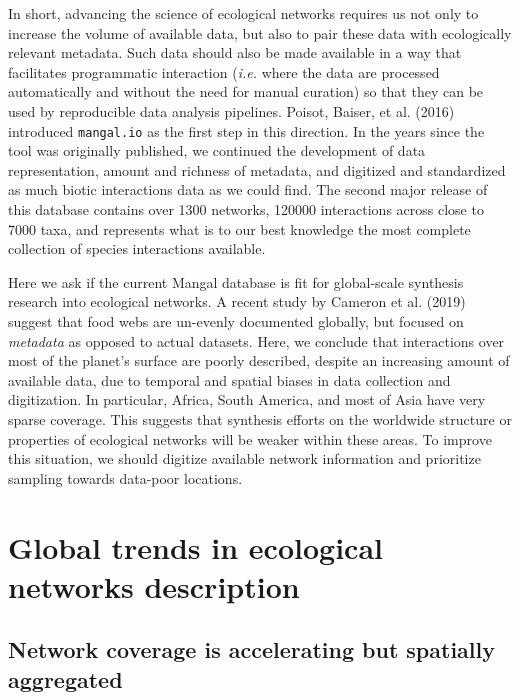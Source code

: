 \documentclass[11pt]{article}
\begin{document}
In short, advancing the science of ecological networks requires us not
only to increase the volume of available data, but also to pair these
data with ecologically relevant metadata. Such data should also be made
available in a way that facilitates programmatic interaction
(\emph{i.e.} where the data are processed automatically and without the
need for manual curation) so that they can be used by reproducible data
analysis pipelines. Poisot, Baiser, et al. (2016) introduced
\texttt{mangal.io} as the first step in this direction. In the years
since the tool was originally published, we continued the development of
data representation, amount and richness of metadata, and digitized and
standardized as much biotic interactions data as we could find. The
second major release of this database contains over 1300 networks,
120000 interactions across close to 7000 taxa, and represents what is to
our best knowledge the most complete collection of species interactions
available.

Here we ask if the current Mangal database is fit for global-scale
synthesis research into ecological networks. A recent study by Cameron
et al. (2019) suggest that food webs are un-evenly documented globally,
but focused on \emph{metadata} as opposed to actual datasets. Here, we
conclude that interactions over most of the planet's surface are poorly
described, despite an increasing amount of available data, due to
temporal and spatial biases in data collection and digitization. In
particular, Africa, South America, and most of Asia have very sparse
coverage. This suggests that synthesis efforts on the worldwide
structure or properties of ecological networks will be weaker within
these areas. To improve this situation, we should digitize available
network information and prioritize sampling towards data-poor locations.

\hypertarget{global-trends-in-ecological-networks-description}{%
\section{Global trends in ecological networks
description}\label{global-trends-in-ecological-networks-description}}

\hypertarget{network-coverage-is-accelerating-but-spatially-aggregated}{%
\subsection{Network coverage is accelerating but spatially
aggregated}\label{network-coverage-is-accelerating-but-spatially-aggregated}}
\end{document}
